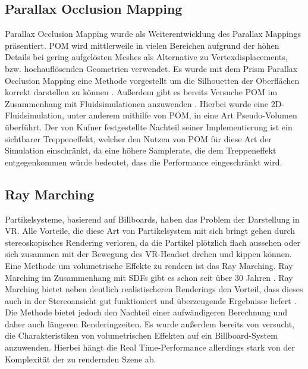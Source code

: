 \subsection{Parallax Occlusion Mapping}
Parallax Occlusion Mapping \parencite{Brawley2004} wurde als Weiterentwicklung des Parallax Mappings \parencite{Kaneko2001} präsentiert.
POM wird mittlerweile in vielen Bereichen aufgrund der höhen Details bei gering aufgelösten Meshes \parencite{Tatarchuk2006} als 
Alternative zu Vertexdisplacements, bzw. hochauflösenden Geometrien verwendet. Es wurde mit dem Prism Parallax Occlusion Mapping
eine Methode vorgestellt um die Silhouetten der Oberflächen korrekt darstellen zu können \parencite{Dachsbacher2007}. 
Außerdem gibt es bereits Versuche POM im Zusammenhang mit Fluidsimulationen 
anzuwenden \parencite{Kufner2017}. Hierbei wurde eine 2D-Fluidsimulation, unter anderem mithilfe von POM, in eine Art Pseudo-Volumen überführt. 
Der von Kufner festgestellte Nachteil seiner Implementierung ist ein sichtbarer Treppeneffekt, welcher den Nutzen von POM für diese 
Art der Simulation einschränkt, da eine höhere Samplerate, die dem Treppeneffekt entgegenkommen würde bedeutet, dass die Performance eingeschränkt wird. 



\subsection{Ray Marching}

Partikelsysteme, basierend auf Billboards, haben das Problem der Darstellung in VR. Alle Vorteile, die diese Art von 
Partikelsystem mit sich bringt gehen durch stereoskopisches Rendering verloren, da die Partikel plötzlich flach aussehen 
oder sich zusammen mit der Bewegung des VR-Headset drehen und kippen können.
Eine Methode um volumetrische Effekte zu rendern ist das Ray Marching. Ray Marching im Zusammenhang mit SDFs gibt es 
schon seit über 30 Jahren \parencite{Hart1989}.
Ray Marching bietet neben deutlich realistischeren Renderings den Vorteil, dass dieses 
auch in der Stereoansicht gut funktioniert und überzeugende Ergebnisse liefert \parencite{Wald2006}. Die Methode bietet 
jedoch den Nachteil einer aufwändigeren Berechnung und daher auch längeren Renderingzeiten. Es wurde außerdem bereits von 
\textcite{Zhang2020} versucht, die Charakteristiken von volumetrischen Effekten auf ein Billboard-System anzuwenden. 
Hierbei hängt die Real Time-Performance allerdings stark von der Komplexität der zu rendernden Szene ab.
